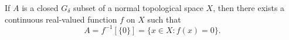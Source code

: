 If $A$ is a closed $G_\delta$ subset of a normal topological space $X$, then there exists a continuous real-valued function $f$ on $X$ such that
$$A = f^{-1}[\{0\}] = \{x \in X : f(x) = 0\}.$$
